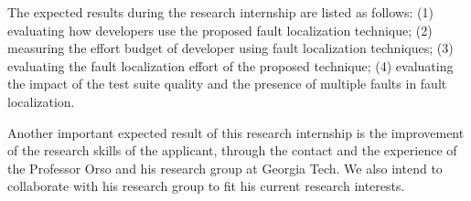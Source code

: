 \documentclass[12pt,a4paper,espaco=umemeio,noindentfirst,oneside,openany,tocpage=plain,pnumromarab,ruledheader,time,anapcustomindent]{sty/abnt}
\begin{document}
The expected results during the research internship are listed as follows: (1) evaluating how developers use the proposed fault localization technique; 
(2) measuring the effort budget of developer using fault localization techniques; (3) evaluating the fault localization effort of the proposed 
technique; (4) evaluating the impact of the test suite quality and the presence of multiple faults in fault localization.

Another important expected result of this research internship is the improvement of the research skills of the applicant, through the contact and 
the experience of the Professor Orso and his research group at Georgia Tech. We also intend to collaborate with his research group to fit his current 
research interests.





\end{document}
